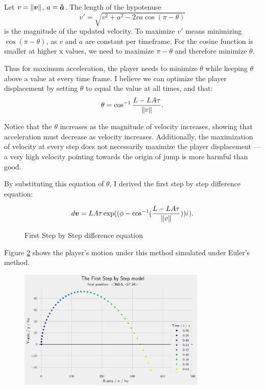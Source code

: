 Let $v = \|\boldsymbol{v}\|$, $a = \boldsymbol{\hat{a}}$. The length of the hypotenuse
\[
    v' = \sqrt{v^2 + a^2 -2 va \cos (\pi - \theta)}
\]
is the magnitude of the updated velocity. To maximize $v'$ means minimizing $\cos(\pi - \theta)$, as $v$ and $a$ are constant per timeframe. For the cosine function is smaller at higher x values, we need to maximize $\pi - \theta$ and therefore minimize $\theta$.

Thus for maximum acceleration, the player needs to minimize $\theta$ while keeping $\theta$ above a value at every time frame. I believe we can optimize the player displacement by setting $\theta$ to equal the value at all times, and that:
\[
    \theta = \cos^{-1} \frac{L-LA\tau}{\|v\|}.
\]

Notice that the $\theta$ increases as the magnitude of velocity increases, showing that acceleration must decrease as velocity increases. Additionally, the maximization of velocity at every step does not necessarily maximize the player displacement --- a very high velocity pointing towards the origin of jump is more harmful than good.

By substituting this equation of $\theta$, I derived the first step by step difference equation:
\begin{figure}[H]
    \centering
    \[
        d\boldsymbol{v} = LA\tau \exp((\phi - \cos^{-1}(\frac{L-LA\tau}{\|v\|})) {i\mkern1mu}).
    \]
    \caption{First Step by Step difference equation}
    \label{fig:sbs}
\end{figure}

Figure \ref{fig:1sbs} shows the player's motion under this method simulated under Euler's method.

\begin{figure}[H]
    \centering
    \includegraphics[width=0.8\textwidth]{assets/step_by_step_1.png}
    \caption{}
    \label{fig:1sbs}
\end{figure}

